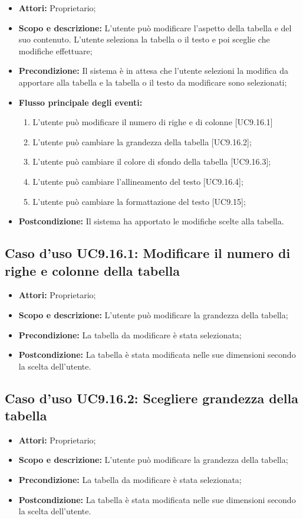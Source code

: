 \begin{itemize}
	\item \textbf{Attori:} Proprietario;
	\item \textbf{Scopo e descrizione:} L'utente può modificare l'aspetto della tabella e del suo contenuto. L'utente seleziona la tabella o il testo e poi sceglie che modifiche effettuare;
	\item \textbf{Precondizione:} Il sistema è in attesa che l'utente selezioni la modifica da apportare alla tabella e la tabella o il testo da modificare sono selezionati;
	\item \textbf{Flusso principale degli eventi:}
	\begin{enumerate}
		\item L'utente può modificare il numero di righe e di colonne [UC9.16.1]
		\item L'utente può cambiare la grandezza della tabella [UC9.16.2];
		\item L'utente può cambiare il colore di sfondo della tabella [UC9.16.3];
		\item L'utente può cambiare l'allineamento del testo [UC9.16.4];
		\item L'utente può cambiare la formattazione del testo [UC9.15];
	\end{enumerate}
	\item \textbf{Postcondizione:} Il sistema ha apportato le modifiche scelte alla tabella.
\end{itemize}

\subsection{Caso d'uso UC9.16.1: Modificare il numero di righe e colonne della tabella}
\begin{itemize}
	\item \textbf{Attori:} Proprietario;
	\item \textbf{Scopo e descrizione:} L'utente può modificare la grandezza della tabella;
	\item \textbf{Precondizione:} La tabella da modificare è stata selezionata;
	\item \textbf{Postcondizione:} La tabella è stata modificata nelle sue dimensioni secondo la scelta dell'utente.
\end{itemize}

\subsection{Caso d'uso UC9.16.2: Scegliere grandezza della tabella}
\begin{itemize}
	\item \textbf{Attori:} Proprietario;
	\item \textbf{Scopo e descrizione:} L'utente può modificare la grandezza della tabella;
	\item \textbf{Precondizione:} La tabella da modificare è stata selezionata;
	\item \textbf{Postcondizione:} La tabella è stata modificata nelle sue dimensioni secondo la scelta dell'utente.
\end{itemize}

